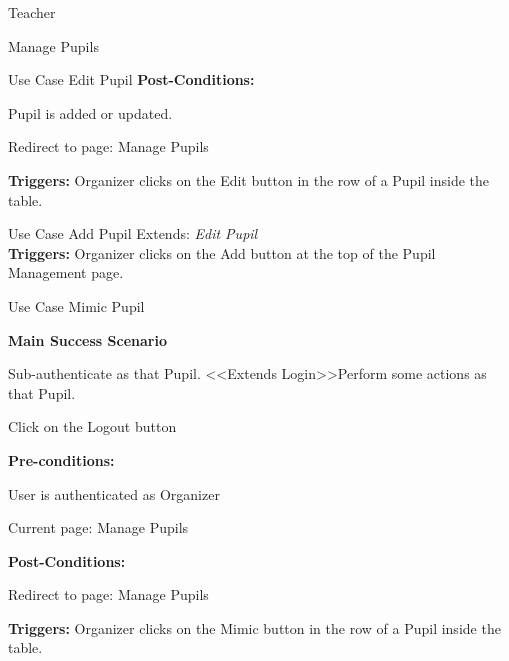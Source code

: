 \documentclass[10pt,a4paper]{article}
\newenvironment{enumerate*}%
  {\begin{enumerate}[topsep=0pt]
    \setlength{\itemsep}{0pt}%
    \setlength{\parskip}{0pt}%
  }{\end{enumerate}}
\begin{document}
\begin{section}{Teacher}
\begin{subsection}{Manage Pupils}
\begin{subsubsection}{Use Case Edit Pupil}
\textbf{Post-Conditions:}
\begin{enumerate*}
\item Pupil is added or updated.
\item Redirect to page: Manage Pupils
\end{enumerate*}

\textbf{Triggers:} Organizer clicks on the Edit button in the row of a Pupil inside the
table.

\end{subsubsection}

\begin{subsubsection}{Use Case Add Pupil}
Extends: \emph{Edit Pupil}\\

\vspace{8 pt}
\textbf{Triggers:} Organizer clicks on the Add button at the top of the Pupil Management
page.
\end{subsubsection}

\begin{subsubsection}{Use Case Mimic Pupil}
\vspace{8 pt}

\textbf{Main Success Scenario}
\begin{enumerate*}
\item Sub-authenticate as that Pupil. \textless\textless Extends Login\textgreater\textgreater Perform some actions as that
Pupil.
\item Click on the Logout button
\end{enumerate*}

\vspace{4 pt}

\textbf{Pre-conditions:}
\begin{enumerate*}
\item User is authenticated as Organizer
\item Current page: Manage Pupils
\end{enumerate*}

\textbf{Post-Conditions:}
\begin{enumerate*}
\item Redirect to page: Manage Pupils
\end{enumerate*}

\textbf{Triggers:} Organizer clicks on the Mimic button in the row of a Pupil inside the
table.

\end{subsubsection}

\end{subsection}
\end{section}
\end{document}
